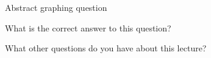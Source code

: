 \documentclass{ximera}
\begin{document}
\begin{question} Abstract graphing question

\end{question}



\begin{question}
  What is the correct answer to this question?

  \begin{solution}
    \begin{multiple-choice}
    \end{multiple-choice}  
  \end{solution}
\end{question}

What other questions do you have about this lecture?
\begin{free-response}
\end{free-response}
\end{document}
